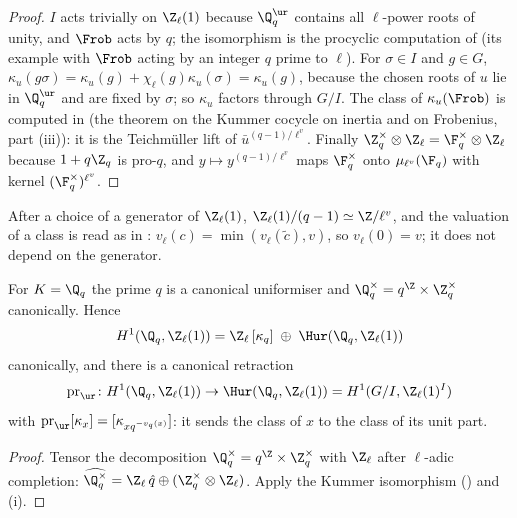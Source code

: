 \begin{proof}
$I$ acts trivially on $\Z_\ell(1)$ because $\Q_q^{\ur}$ contains all $\ell$-power roots of unity, and $\Frob$ acts by $q$; the isomorphism is the procyclic computation of
 (its example with $\Frob$ acting by an integer $q$ prime to $\ell$). For $\sigma\in I$ and $g\in G$, $\kappa_u(g\sigma)=\kappa_u(g)+\chi_\ell(g)\kappa_u(\sigma)=\kappa_u(g)$,
because the chosen roots of $u$ lie in $\Q_q^{\ur}$ and are fixed by $\sigma$; so $\kappa_u$ factors through $G/I$. The class of $\kappa_u(\Frob)$ is computed in
 (the theorem on the Kummer cocycle on inertia and on Frobenius, part (iii)): it is the Teichm\"uller lift of $\bar u^{(q-1)/\ell^v}$. Finally
$\Z_q^\times\otimes\Z_\ell=\F_q^\times\otimes\Z_\ell$ because $1+q\Z_q$ is pro-$q$, and $y\mapsto y^{(q-1)/\ell^v}$ maps $\F_q^\times$ onto $\mu_{\ell^v}(\F_q)$ with kernel
$(\F_q^\times)^{\ell^v}$.
\end{proof}

After a choice of a generator of $\Z_\ell(1)$, $\Z_\ell(1)/(q-1)\simeq\Z/\ell^v$, and the valuation of a class is read as in : $v_\ell(c)=\min(v_\ell(\tilde c),v)$,
so $v_\ell(0)=v$; it does not depend on the generator.

\begin{proposition}\label{prop:galcoh:canonical-splitting}
For $K=\Q_q$ the prime $q$ is a canonical uniformiser and $\Q_q^\times=q^{\Z}\times\Z_q^\times$ canonically. Hence
\[
H^1(\Q_q,\Z_\ell(1))=\Z_\ell\,[\kappa_q]\;\oplus\;\Hur(\Q_q,\Z_\ell(1))
\]
canonically, and there is a canonical retraction
\[
\operatorname{pr}_{\ur}\colon H^1(\Q_q,\Z_\ell(1))\to\Hur(\Q_q,\Z_\ell(1))=H^1(G/I,\Z_\ell(1)^I)
\]
with
$\operatorname{pr}_{\ur}[\kappa_x]=[\kappa_{xq^{-v_q(x)}}]$: it sends the class of $x$ to the class of its unit part.
\end{proposition}

\begin{proof}
Tensor the decomposition $\Q_q^\times=q^{\Z}\times\Z_q^\times$ with $\Z_\ell$ after $\ell$-adic completion: $\widehat{\Q_q^\times}=\Z_\ell\,\hat q\oplus(\Z_q^\times\otimes\Z_\ell)$. Apply the
Kummer isomorphism () and (i).
\end{proof}

